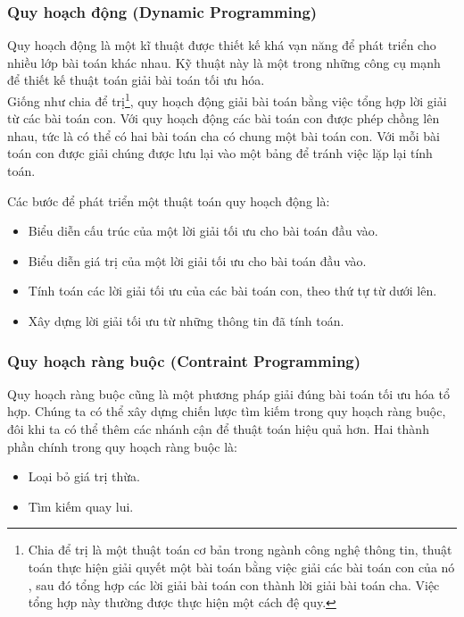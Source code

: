 \documentclass[a4paper,12pt]{report}
\begin{document}
\subsubsection{Quy hoạch động (Dynamic Programming)}
Quy hoạch động \cite{ITA} là một kĩ thuật được thiết kế khá vạn năng để phát triển cho nhiều lớp bài toán khác nhau. Kỹ thuật này là một trong những công cụ mạnh để thiết kế thuật toán giải bài toán tối ưu hóa.\\

Giống như chia để trị\footnote{Chia để trị là một thuật toán cơ bản trong ngành công nghệ thông tin, thuật toán thực hiện giải quyết một bài toán bằng việc giải các bài toán con của nó , sau đó tổng hợp các lời giải bài toán con thành lời giải bài toán cha. Việc tổng hợp này thường được thực hiện một cách đệ quy.}, quy hoạch động giải bài toán bằng việc tổng hợp lời giải từ các bài toán con. Với quy hoạch động các bài toán con được phép chồng lên nhau, tức là có thể có hai bài toán cha có chung một bài toán con. Với mỗi bài toán con được giải chúng được lưu lại vào một bảng để tránh việc lặp lại tính toán. 

 Các bước để phát triển một thuật toán quy hoạch động là:
\begin{itemize}
\item Biểu diễn cấu trúc của một lời giải  tối ưu cho bài toán đầu vào.
\item Biểu diễn giá trị của một lời giải tối ưu cho bài toán đầu vào.
\item Tính toán các lời giải tối ưu của các bài toán con, theo thứ tự từ dưới lên.
\item Xây dựng lời giải tối ưu từ những thông tin đã tính toán.
\end{itemize}
 
\subsubsection{Quy hoạch ràng buộc (Contraint Programming)}
Quy hoạch ràng buộc \cite{HCP} cũng là một phương pháp giải đúng bài toán tối ưu hóa tổ hợp. Chúng ta có thể xây dựng chiến lược tìm kiếm trong quy hoạch ràng buộc, đôi khi ta có thể thêm các nhánh cận để thuật toán hiệu quả hơn. Hai thành phần chính trong quy hoạch ràng buộc là: \begin{itemize}
\item Loại bỏ giá trị thừa.
\item Tìm kiếm quay lui.
\end{itemize}
\end{document}
